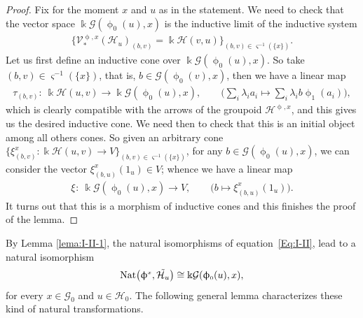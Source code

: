 \documentclass[pdftex]{sigma}
\numberwithin{equation}{section}
\newcommand{\Go}{\cG_{\Sscript{0}}}
\newcommand{\Ho}{\cH_{\Sscript{0}}}
\newcommand{\vV}{\mathscr{V}}
\newcommand{\cG}{{\mathcal G}}
\newcommand{\cH}{{\mathcal H}}
\newcommand{\Sscript}[1]{\scriptscriptstyle{#1}}
\newcommand{\phio}{\upphi_{\Sscript{0}}}
\newcommand{\phia}{\upphi_{\Sscript{1}}}
\begin{document}
\begin{proof}Fix for the moment $x$ and $u$ as in the statement. We need to check that the vector space $\Bbbk \cG(\phio(u), x)$ is the inductive limit of the inductive system
\begin{gather*}
\big\{ \vV^{\Sscript{\upphi, x}}_*(\cH_{u})_{\Sscript{(b, v)}}=\Bbbk \cH(v,u) \big\}_{\Sscript{(b, v) \in \varsigma^{-1}(\{x\})}}.
\end{gather*}
Let us first define an inductive cone over $\Bbbk \cG(\phio(u), x)$. So take $(b,v) \in \varsigma^{-1}(\{x\})$, that is, $b \in \cG(\phio(v), x)$, then we have a linear map
\begin{gather*}
\tau_{\Sscript{(b, v)}}\colon \ \Bbbk \cH(u,v) \longrightarrow \Bbbk\cG(\phio(u), x),\qquad \bigg( \sum_{i}\lambda_{i} a_{i} \longmapsto \sum_{i}\lambda_{i} b\phia(a_{i})\bigg),
\end{gather*}
which is clearly compatible with the arrows of the groupoid $\cH^{\Sscript{\upphi, x}}$, and this gives us the desired inductive cone. We need then to check that this is an initial object among all others cones. So given an arbitrary cone $\big\{\xi^{\Sscript{x}}_{\Sscript{(b, v)}}\colon \Bbbk\cH(u,v) \to V\big\}_{\Sscript{(b, v)} \in \varsigma^{-1}(\{x\}) }$, for any $b \in \cG(\phio(u), x)$, we can consider the vector $\xi^{\Sscript{x}}_{\Sscript{(b, u)}}(1_{u}) \in V$; whence we have a linear map
\begin{gather*}
\xi_{ }\colon \ \Bbbk \cG(\phio(u),x) \longrightarrow V, \qquad \big( b \longmapsto \xi^{\Sscript{x}}_{\Sscript{(b, u)}}(1_{u}) \big).
\end{gather*}
It turns out that this is a morphism of inductive cones and this finishes the proof of the lem\-ma.
\end{proof}

By Lemma \ref{lema:I-II-1}, the natural isomorphisms of equation~\eqref{Eq:I-II}, lead to a natural isomorphism
\begin{gather*}
{\rm Nat}\big(\upphi^{\Sscript{x}}, \tilde{\cH_{u}}\big) \cong \Bbbk \cG(\phio(u),x),
\end{gather*}
for every $x \in \Go$ and $u \in \Ho$. The following general lemma characterizes these kind of natural transformations.
\end{document}
